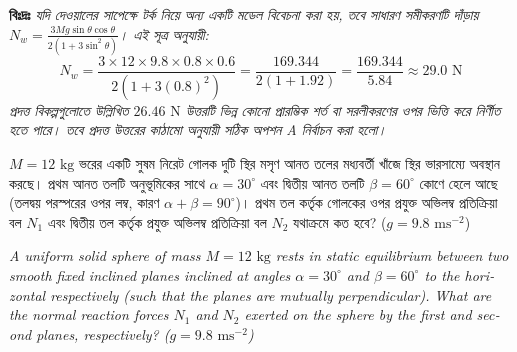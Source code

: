 \documentclass[12pt, a4paper]{article}
\begin{document}
{\begin{tcolorbox}[solutionbox={সমাধান (Solution)}]
\vspace{0.5em}
\textbf{বিঃদ্রঃ} \textit{যদি দেওয়ালের সাপেক্ষে টর্ক নিয়ে অন্য একটি মডেল বিবেচনা করা হয়, তবে সাধারণ সমীকরণটি দাঁড়ায় $N_w = \frac{3 M g \sin\theta \cos\theta}{2(1 + 3\sin^2\theta)}$। এই সূত্র অনুযায়ী:
$$N_w = \frac{3 \times 12 \times 9.8 \times 0.8 \times 0.6}{2(1 + 3(0.8)^2)} = \frac{169.344}{2(1 + 1.92)} = \frac{169.344}{5.84} \approx 29.0\text{ N}$$
প্রদত্ত বিকল্পগুলোতে উল্লিখিত $26.46\text{ N}$ উত্তরটি ভিন্ন কোনো প্রারম্ভিক শর্ত বা সরলীকরণের ওপর ভিত্তি করে নির্ণীত হতে পারে। তবে প্রদত্ত উত্তরের কাঠামো অনুযায়ী সঠিক অপশন A নির্বাচন করা হলো।}
\end{tcolorbox}
\vspace{1em}


\begin{tcolorbox}[questionbox={প্রশ্ন (Question) 37}]
\noindent
$M = 12\text{ kg}$ ভরের একটি সুষম নিরেট গোলক দুটি স্থির মসৃণ আনত তলের মধ্যবর্তী খাঁজে স্থির ভারসাম্যে অবস্থান করছে। প্রথম আনত তলটি অনুভূমিকের সাথে $\alpha = 30^\circ$ এবং দ্বিতীয় আনত তলটি $\beta = 60^\circ$ কোণে হেলে আছে (তলদ্বয় পরস্পরের ওপর লম্ব, কারণ $\alpha + \beta = 90^\circ$)। প্রথম তল কর্তৃক গোলকের ওপর প্রযুক্ত অভিলম্ব প্রতিক্রিয়া বল $N_1$ এবং দ্বিতীয় তল কর্তৃক প্রযুক্ত অভিলম্ব প্রতিক্রিয়া বল $N_2$ যথাক্রমে কত হবে? ($g = 9.8\text{ ms}^{-2}$)

\vspace{0.8em}
\begin{english}
\noindent\textit{\color{darkgray}
A uniform solid sphere of mass $M = 12\text{ kg}$ rests in static equilibrium between two smooth fixed inclined planes inclined at angles $\alpha = 30^\circ$ and $\beta = 60^\circ$ to the horizontal respectively (such that the planes are mutually perpendicular). What are the normal reaction forces $N_1$ and $N_2$ exerted on the sphere by the first and second planes, respectively? ($g = 9.8\text{ ms}^{-2}$)
}
\end{english}
\end{tcolorbox}

\vspace{1em}
\begin{center}
\end{center}}
\end{document}

